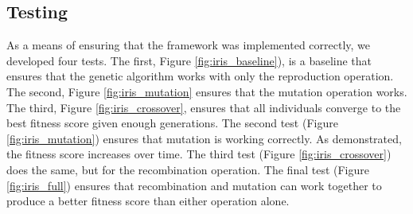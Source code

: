 \documentclass[12pt, final]{dalcsthesis}
\begin{document}
\subsection{Testing}
As a means of ensuring that the framework was implemented correctly, we developed four tests.
The first, Figure \ref{fig:iris_baseline}), is a baseline that ensures that the genetic algorithm works with only the reproduction operation. The second,
Figure \ref{fig:iris_mutation} ensures that the mutation operation works. The third, Figure \ref{fig:iris_crossover}, ensures that
all individuals converge to the best fitness score given enough generations. The second test (Figure \ref{fig:iris_mutation})
ensures that mutation is working correctly. As demonstrated, the fitness score increases over time. The third test (Figure \ref{fig:iris_crossover})
does the same, but for the recombination operation. The final test (Figure \ref{fig:iris_full}) ensures that recombination and mutation can work together to produce a better fitness score than either operation alone.
\end{document}
